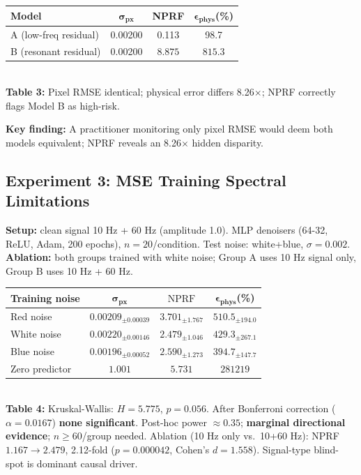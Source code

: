 \documentclass[9pt,twocolumn]{article}
\theoremstyle{remark}
\theoremstyle{definition}
\newcommand{\pxrmse}{\sigma_{\text{px}}}
\newcommand{\physerr}{\epsilon_{\text{phys}}}
\newcommand{\nprf}{\text{NPRF}}
\begin{document}
\begin{center}
    \scriptsize\setlength{\tabcolsep}{3.0pt}
    \begin{tabular}{lccc}
        \toprule
        \textbf{Model} & $\bm{\sigma_{\text{px}}}$ & \textbf{NPRF} & $\bm{\physerr}$(\%) \\
        \midrule
        A (low-freq residual) & 0.00200 & 0.113 & 98.7 \\
        B (resonant residual) & 0.00200 & $\mathbf{8.875}$ & $\mathbf{815.3}$ \\
        \bottomrule
    \end{tabular}
    \\[0.1pt]
    {\scriptsize \textbf{Table 3:} Pixel RMSE identical; physical error differs 8.26$\times$; NPRF correctly flags Model B as high-risk.}
\end{center}

\textbf{Key finding:} A practitioner monitoring only pixel RMSE would deem both models equivalent; NPRF reveals an 8.26$\times$ hidden disparity.

\subsection{Experiment 3: MSE Training Spectral Limitations}

\textbf{Setup:} clean signal 10 Hz + 60 Hz (amplitude 1.0). MLP denoisers (64-32, ReLU, Adam, 200 epochs), $n=20$/condition. Test noise: white+blue, $\sigma=0.002$. \textbf{Ablation:} both groups trained with white noise; Group A uses 10 Hz signal only, Group B uses 10 Hz + 60 Hz.

\begin{center}
    \scriptsize\setlength{\tabcolsep}{2.2pt}
    \begin{tabular}{lccc}
        \toprule
        \textbf{Training noise} & $\bm{\pxrmse}$ & $\nprf$ & $\bm{\physerr}$(\%) \\
        \midrule
        Red noise & $0.00209_{\pm0.00039}$ & $3.701_{\pm1.767}$ & $510.5_{\pm194.0}$ \\
        White noise & $0.00220_{\pm0.00146}$ & $2.479_{\pm1.046}$ & $429.3_{\pm267.1}$ \\
        Blue noise & $0.00196_{\pm0.00052}$ & $2.590_{\pm1.273}$ & $394.7_{\pm147.7}$ \\
        \midrule
        Zero predictor & $1.001$ & $5.731$ & $281219$ \\
        \bottomrule
    \end{tabular}
    \\[0.1pt]
    {\scriptsize \textbf{Table 4:} Kruskal-Wallis: $H=5.775$, $p=0.056$. After Bonferroni correction ($\alpha=0.0167$) \textbf{none significant}. Post-hoc power $\approx0.35$; \textbf{marginal directional evidence}; $n\geq60$/group needed. Ablation (10 Hz only vs.\ 10+60 Hz): NPRF $1.167\to2.479$, 2.12-fold ($p=0.000042$, Cohen's $d=1.558$). Signal-type blind-spot is dominant causal driver.}
\end{center}
\end{document}
